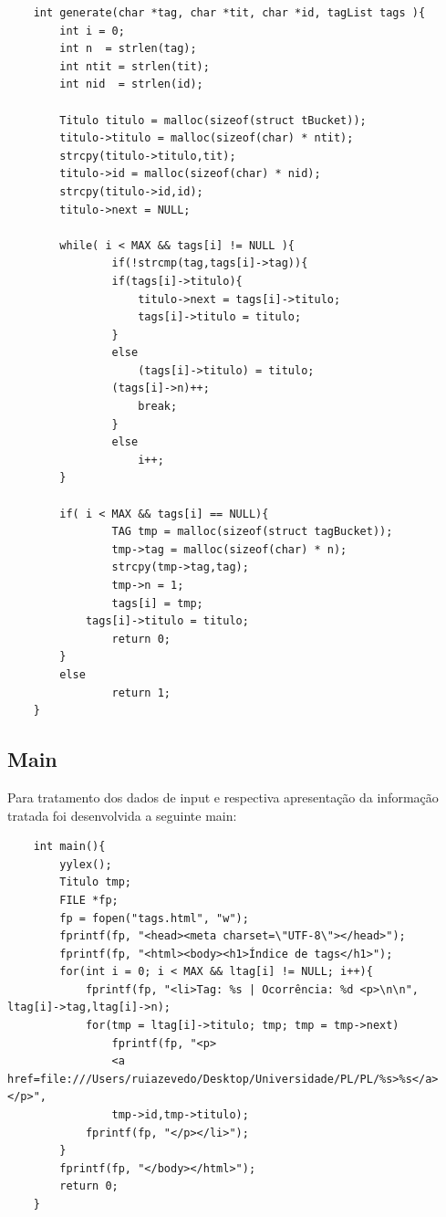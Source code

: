 \documentclass[25pt]{article}
\begin{document}
    \begin{verbatim}
    int generate(char *tag, char *tit, char *id, tagList tags ){
        int i = 0;
        int n  = strlen(tag);
        int ntit = strlen(tit);
        int nid  = strlen(id);
    
        Titulo titulo = malloc(sizeof(struct tBucket));
        titulo->titulo = malloc(sizeof(char) * ntit);
        strcpy(titulo->titulo,tit);
        titulo->id = malloc(sizeof(char) * nid);
        strcpy(titulo->id,id);
        titulo->next = NULL;
    
        while( i < MAX && tags[i] != NULL ){
                if(!strcmp(tag,tags[i]->tag)){
                if(tags[i]->titulo){
                    titulo->next = tags[i]->titulo;
                    tags[i]->titulo = titulo;
                }
                else
                    (tags[i]->titulo) = titulo;
                (tags[i]->n)++;
                    break;
                }
                else
                    i++;
        }
    
        if( i < MAX && tags[i] == NULL){
                TAG tmp = malloc(sizeof(struct tagBucket));
                tmp->tag = malloc(sizeof(char) * n);
                strcpy(tmp->tag,tag);
                tmp->n = 1;
                tags[i] = tmp;
            tags[i]->titulo = titulo;
                return 0;
        }
        else
                return 1;
    }
    \end{verbatim}
    \subsection{Main}
    Para tratamento dos dados de input e respectiva apresentação da informação tratada foi desenvolvida a seguinte main:
    \begin{verbatim}
    int main(){
        yylex();
        Titulo tmp;
        FILE *fp;
        fp = fopen("tags.html", "w");
        fprintf(fp, "<head><meta charset=\"UTF-8\"></head>");
        fprintf(fp, "<html><body><h1>Índice de tags</h1>");
        for(int i = 0; i < MAX && ltag[i] != NULL; i++){
            fprintf(fp, "<li>Tag: %s | Ocorrência: %d <p>\n\n", ltag[i]->tag,ltag[i]->n);
            for(tmp = ltag[i]->titulo; tmp; tmp = tmp->next)
                fprintf(fp, "<p>
                <a href=file:///Users/ruiazevedo/Desktop/Universidade/PL/PL/%s>%s</a></p>",
                tmp->id,tmp->titulo);
            fprintf(fp, "</p></li>");
        }
        fprintf(fp, "</body></html>");
        return 0;
    }
    \end{verbatim}
\end{document}
